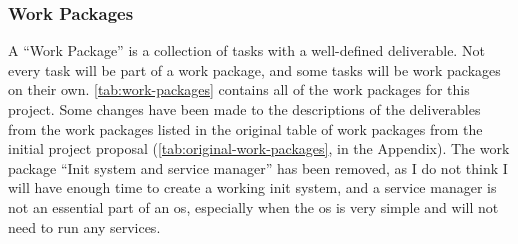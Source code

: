 \documentclass{article}
\begin{document}
\subsubsection{Work Packages}
\label{sec:work_packages}
A ``Work Package'' is a collection of tasks with a well-defined deliverable.
Not every task will be part of a work package, and some tasks will be work
packages on their own. \autoref{tab:work-packages} contains all of the work
packages for this project. Some changes have been made to the descriptions of
the deliverables from the work packages listed in the original table of work
packages from the initial project proposal
(\autoref{tab:original-work-packages}, in the Appendix). The work package
``Init system and service manager'' has been removed, as I do not think I will
have enough time to create a working init system, and a service manager is not
an essential part of an \gls{os}, especially when the \gls{os} is very simple
and will not need to run any services.
\end{document}
